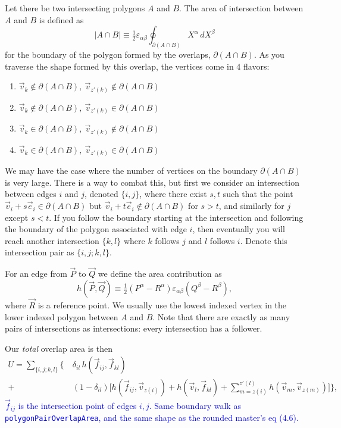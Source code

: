 \documentclass[11pt]{article}
\numberwithin{equation}{section}
\newcommand{\vv}[1]{\vec{#1}}
\newcommand{\eps}{\varepsilon}
\newcommand{\half}{\tfrac{1}{2}}
\newcommand{\cam}[1]{\textcolor{blue}{#1}}
\begin{document}
Let there be two intersecting polygons $A$ and $B$. The area of intersection between $A$ and $B$ is
defined as
\begin{equation}
  |A\cap B|\equiv\half\eps_{\alpha\beta}\oint_{\partial(A\cap B)}X^\alpha\,dX^\beta
\end{equation}
for the boundary of the polygon formed by the overlaps, $\partial(A\cap B)$. As you traverse the
shape formed by this overlap, the vertices come in 4 flavors:
\begin{enumerate}
\item $\vv v_k\notin\partial(A\cap B),\ \vv v_{z'(k)}\notin\partial(A\cap B)$
\item $\vv v_k\notin\partial(A\cap B),\ \vv v_{z'(k)}\in\partial(A\cap B)$
\item $\vv v_k\in\partial(A\cap B),\ \vv v_{z'(k)}\notin\partial(A\cap B)$
\item $\vv v_k\in\partial(A\cap B),\ \vv v_{z'(k)}\in\partial(A\cap B)$
\end{enumerate}
We may have the case where the number of vertices on the boundary $\partial(A\cap B)$ is very large.
There is a way to combat this, but first we consider an intersection between edges $i$ and $j$,
denoted $\{i,j\}$, where there exist $s,t$ such that the point $\vv v_i+s\vv e_i\in\partial(A\cap B)$
but $\vv v_i+t\vv e_i\notin\partial(A\cap B)$ for $s>t$, and similarly for $j$ except $s<t$. If you
follow the boundary starting at the intersection and following the boundary of the polygon
associated with edge $i$, then eventually you will reach another intersection $\{k,l\}$ where $k$
follows $j$ and $l$ follows $i$. Denote this intersection pair as $\{i,j;k,l\}$.

For an edge from $\vv P$ to $\vv Q$ we define the area contribution as
\begin{equation}
  h(\vv P,\vv Q)\equiv\half(P^\alpha-R^\alpha)\eps_{\alpha\beta}(Q^\beta-R^\beta),
\end{equation}
where $\vv R$ is a reference point. We usually use the lowest indexed vertex in the lower indexed
polygon between $A$ and $B$. Note that there are exactly as many pairs of intersections as
intersections: every intersection has a follower.

Our \emph{total} overlap area is then
\begin{equation}
\begin{aligned}
  U=\sum_{\{i,j;k,l\}}\Big\{\ &\delta_{il}\,h(\vv f_{ij},\vv f_{kl})\\
  +\ &(1-\delta_{il})\Big[h(\vv f_{ij},\vv v_{z(i)})+h(\vv v_l,\vv f_{kl})
  +\sum_{m=z(i)}^{z'(l)}h(\vv v_m,\vv v_{z(m)})\Big]\Big\},
\end{aligned}
\end{equation}
\cam{$\vv f_{ij}$ is the intersection point of edges $i,j$. Same boundary walk as
\texttt{polygonPairOverlapArea}, and the same shape as the rounded master's eq (4.6).}
\end{document}
